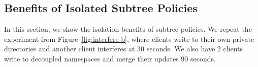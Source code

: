 %
%
%
%
%
%
%
%
%
%
%

\subsection{Benefits of Isolated Subtree Policies}
In this section, we show the isolation benefits of subtree policies.  We repeat
the experiment from Figure~\ref{fig:interfere-b}, where clients write to their
own private directories and another client interferes at 30 seconds.  We also
have 2 clients write to decoupled namespaces and merge their updates 90
seconds.

